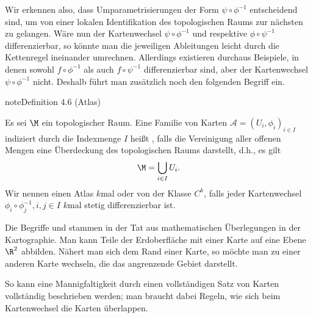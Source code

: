 \documentclass[letterpaper,10pt,english]{jupyterBook}
\begin{document}
\sphinxAtStartPar
Wir erkennen also, dass Umparametrisierungen der Form \(\psi\circ \phi^{-1}\) entscheidend sind, um von einer lokalen Identifikation des topologischen Raums zur nächsten zu gelangen.
Wäre nun der Kartenwechsel \(\psi\circ \phi^{-1}\) und respektive \(\phi\circ \psi^{-1}\) differenzierbar, so könnte man die jeweiligen Ableitungen leicht durch die Kettenregel ineinander umrechnen.
Allerdings existieren durchaus Beispiele, in denen sowohl \(f\circ\phi^{-1}\) als auch \(f\circ\psi^{-1}\) differenzierbar sind, aber der Kartenwechsel \(\psi\circ\phi^{-1}\) nicht.
Deshalb führt man zusätzlich noch den folgenden Begriff ein.
\label{manifolds/manifolds_prelim:definition-8}
\begin{sphinxadmonition}{note}{Definition 4.6 (Atlas)}



\sphinxAtStartPar
Es sei \(\M\) ein topologischer Raum.
Eine Familie von Karten \(\mathcal{A} = (U_i,\phi_i)_{i\in I}\) indiziert durch die Indexmenge \(I\) heißt , falls die Vereinigung aller offenen Mengen eine Überdeckung des topologischen Raums darstellt, d.h., es gilt
\begin{equation*}
\begin{split}\M = \bigcup_{i\in I} U_i.\end{split}
\end{equation*}
\sphinxAtStartPar
Wir nennen einen Atlas \(k\)\sphinxhyphen{}mal  oder von der Klasse \(C^k\), falls jeder Kartenwechsel \(\phi_i\circ\phi_j^{-1}, i,j\in I\) \(k\)\sphinxhyphen{}mal stetig differenzierbar ist.
\end{sphinxadmonition}

\sphinxAtStartPar
Die Begriffe  und  stammen in der Tat aus mathematischen Überlegungen in der Kartographie.
Man kann Teile der Erdoberfläche mit einer Karte auf eine Ebene \(\R^2\) abbilden.
Nähert man sich dem Rand einer Karte, so möchte man zu einer anderen Karte wechseln, die das angrenzende Gebiet darstellt.

\sphinxAtStartPar
So kann eine Mannigfaltigkeit durch einen vollständigen Satz von Karten vollständig beschrieben werden; man braucht dabei Regeln, wie sich beim Kartenwechsel die Karten überlappen.
\end{document}
